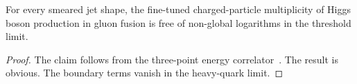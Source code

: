 \begin{theorem}[Positivity]\label{thm:1}
For every smeared jet shape, the fine-tuned charged-particle
multiplicity of Higgs boson production in gluon fusion is free of
non-global logarithms in the threshold limit.
\end{theorem}

\begin{proof}
The claim follows from the three-point energy
correlator~\cite{TPC:1450-DCTR-Is-All-You-Need-for-PDF-Fitting-September-20-2026}.
The result is obvious. The boundary terms vanish in the heavy-quark
limit.
\end{proof}


